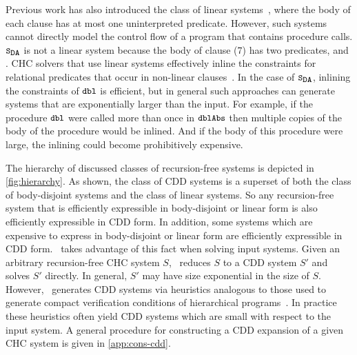 Previous work has also introduced the class of linear
systems~\cite{albarghouthi12a}, where the body of each clause has at
most one uninterpreted predicate.
%
However, such systems cannot directly model the control flow of a
program that contains procedure calls.
%
$\mcchc$ is not a linear system because the body of clause (7) has two
predicates,  and .
%
CHC solvers that use linear systems effectively inline the
constraints for relational predicates that occur in non-linear
clauses~\cite{albarghouthi12b}.
%
In the case of $\mcchc$, inlining the constraints of $\cc{dbl}$ is
efficient, but in general such approaches can generate systems that
are exponentially larger than the input. For example, if the procedure
$\cc{dbl}$ were called more than once in $\cc{dblAbs}$ then multiple
copies of the body of the procedure would be inlined. And if the body
of this procedure were large, the inlining could become
prohibitively expensive.

\begin{figure}[t]
  \centering
  \begin{floatrow}[2]
      {}
      {}
  \end{floatrow}
\end{figure}

The hierarchy of discussed classes of recursion-free systems is
depicted in \autoref{fig:hierarchy}.
%
As shown, the class of CDD systems is a superset of both the class
of body-disjoint systems and the class of linear systems. So any
recursion-free system that is efficiently expressible in body-disjoint
or linear form is also efficiently expressible in CDD form.
%
In addition, some systems which are expensive to express in
body-disjoint or linear form are efficiently expressible in CDD form.
%
\sys~takes advantage of this fact when solving input systems.
Given an arbitrary recursion-free CHC system $S$, \sys~reduces $S$ to
a CDD system $S'$ and solves $S'$ directly.
%
In general, $S'$ may have size exponential in the size of
$S$.
%
However, \sys~generates CDD systems via heuristics analogous to
those used to generate compact verification conditions of hierarchical
programs~\cite{flanagan01,lal-qadeer15}.
%
In practice these heuristics often yield CDD systems which are
small with respect to the input system.
%
A general procedure for constructing a CDD expansion of a given CHC
system is given in \autoref{app:cons-cdd}.
